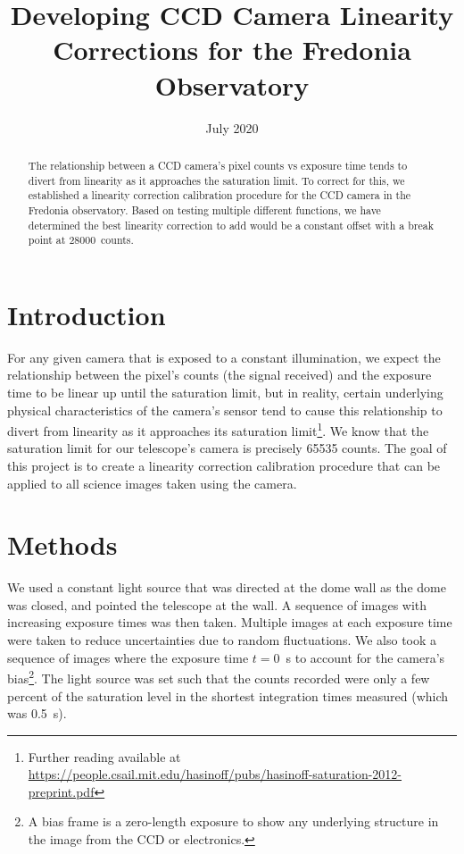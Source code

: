 \documentclass{article}
\title{Developing CCD Camera Linearity Corrections for the Fredonia Observatory}
\author[1]{\sc{Zach Yek}}
\author[1]{\sc{Michael M. Dunham}}
\affil[1]{Department of Physics, State University of New York at Fredonia, 280 Central Ave, Fredonia, NY 14063, USA}
\date{July 2020}
\begin{document}
\maketitle

\begin{abstract}
    The relationship between a CCD camera's pixel counts vs exposure time tends to divert from linearity as it approaches the saturation limit. To correct for this, we established a linearity correction calibration procedure for the CCD camera in the Fredonia observatory. Based on testing multiple different functions, we have determined the best linearity correction to add would be a constant offset with a break point at 28000~counts.
\end{abstract}

\section{Introduction}
For any given camera that is exposed to a constant illumination, we expect the relationship between the pixel's counts (the signal received) and the exposure time to be linear up until the saturation limit, but in reality, certain underlying physical characteristics of the camera's sensor tend to cause this relationship to divert from linearity as it approaches its saturation limit\footnote{Further reading available at \href{ https://people.csail.mit.edu/hasinoff/pubs/hasinoff-saturation-2012-preprint.pdf}{https://people.csail.mit.edu/hasinoff/pubs/hasinoff-saturation-2012-preprint.pdf}}. We know that the saturation limit for our telescope's camera is precisely 65535 counts. The goal of this project is to create a linearity correction calibration procedure that can be applied to all science images taken using the camera.

\section{Methods}
We used a constant light source that was directed at the dome wall as the dome was closed, and pointed the telescope at the wall. A sequence of images with increasing exposure times was then taken. Multiple images at each exposure time were taken to reduce uncertainties due to random fluctuations. We also took a sequence of images where the exposure time $t=0$~s to account for the camera's bias\footnote{A bias frame is a zero-length exposure to show any underlying structure in the image from the CCD or electronics.}. The light source was set such that the counts recorded were only a few percent of the saturation level in the shortest integration times measured (which was 0.5~s).
\end{document}
